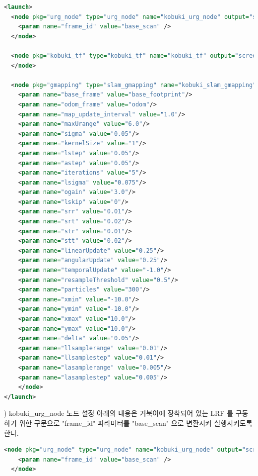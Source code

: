 \vspace{\baselineskip}
\begin{lstlisting}[language=XML]
<launch>
  <node pkg="urg_node" type="urg_node" name="kobuki_urg_node" output="screen">
    <param name="frame_id" value="base_scan" />
  </node>

  <node pkg="kobuki_tf" type="kobuki_tf" name="kobuki_tf" output="screen">
  </node>

  <node pkg="gmapping" type="slam_gmapping" name="kobuki_slam_gmapping" output="screen">
    <param name="base_frame" value="base_footprint"/>
    <param name="odom_frame" value="odom"/>
    <param name="map_update_interval" value="1.0"/>
    <param name="maxUrange" value="6.0"/>
    <param name="sigma" value="0.05"/>
    <param name="kernelSize" value="1"/>
    <param name="lstep" value="0.05"/>
    <param name="astep" value="0.05"/>
    <param name="iterations" value="5"/>
    <param name="lsigma" value="0.075"/>
    <param name="ogain" value="3.0"/>
    <param name="lskip" value="0"/>
    <param name="srr" value="0.01"/>
    <param name="srt" value="0.02"/>
    <param name="str" value="0.01"/>
    <param name="stt" value="0.02"/>
    <param name="linearUpdate" value="0.25"/>
    <param name="angularUpdate" value="0.25"/>
    <param name="temporalUpdate" value="-1.0"/>
    <param name="resampleThreshold" value="0.5"/>
    <param name="particles" value="300"/>
    <param name="xmin" value="-10.0"/>
    <param name="ymin" value="-10.0"/>
    <param name="xmax" value="10.0"/>
    <param name="ymax" value="10.0"/>
    <param name="delta" value="0.05"/>
    <param name="llsamplerange" value="0.01"/>
    <param name="llsamplestep" value="0.01"/>
    <param name="lasamplerange" value="0.005"/>
    <param name="lasamplestep" value="0.005"/>
    </node>
</launch>
\end{lstlisting}



\vspace{\baselineskip}
\noindent
{}) kobuki\_urg\_node 노드 설정
아래의 내용은 거북이에 장착되어 있는 LRF 를 구동하기 위한 구문으로 "frame\_id" 파라미터를 "base\_scan" 으로 변환시켜 실행시키도록 한다.

\vspace{\baselineskip}
\begin{lstlisting}[language=XML]
  <node pkg="urg_node" type="urg_node" name="kobuki_urg_node" output="screen">
    <param name="frame_id" value="base_scan" />
  </node>
\end{lstlisting}

